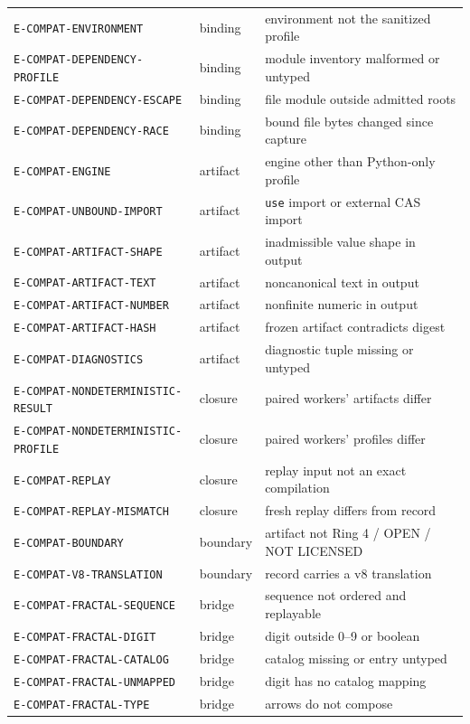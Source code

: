 \begin{longtable}{@{}lll@{}}
\texttt{E-COMPAT-ENVIRONMENT} & binding & environment not the sanitized profile \\
\texttt{E-COMPAT-DEPENDENCY-PROFILE} & binding & module inventory malformed or untyped \\
\texttt{E-COMPAT-DEPENDENCY-ESCAPE} & binding & file module outside admitted roots \\
\texttt{E-COMPAT-DEPENDENCY-RACE} & binding & bound file bytes changed since capture \\
\texttt{E-COMPAT-ENGINE} & artifact & engine other than Python-only profile \\
\texttt{E-COMPAT-UNBOUND-IMPORT} & artifact & \texttt{use} import or external CAS import \\
\texttt{E-COMPAT-ARTIFACT-SHAPE} & artifact & inadmissible value shape in output \\
\texttt{E-COMPAT-ARTIFACT-TEXT} & artifact & noncanonical text in output \\
\texttt{E-COMPAT-ARTIFACT-NUMBER} & artifact & nonfinite numeric in output \\
\texttt{E-COMPAT-ARTIFACT-HASH} & artifact & frozen artifact contradicts digest \\
\texttt{E-COMPAT-DIAGNOSTICS} & artifact & diagnostic tuple missing or untyped \\
\texttt{E-COMPAT-NONDETERMINISTIC-RESULT} & closure & paired workers' artifacts differ \\
\texttt{E-COMPAT-NONDETERMINISTIC-PROFILE} & closure & paired workers' profiles differ \\
\texttt{E-COMPAT-REPLAY} & closure & replay input not an exact compilation \\
\texttt{E-COMPAT-REPLAY-MISMATCH} & closure & fresh replay differs from record \\
\texttt{E-COMPAT-BOUNDARY} & boundary & artifact not Ring 4 / OPEN / NOT LICENSED \\
\texttt{E-COMPAT-V8-TRANSLATION} & boundary & record carries a v8 translation \\
\texttt{E-COMPAT-FRACTAL-SEQUENCE} & bridge & sequence not ordered and replayable \\
\texttt{E-COMPAT-FRACTAL-DIGIT} & bridge & digit outside 0--9 or boolean \\
\texttt{E-COMPAT-FRACTAL-CATALOG} & bridge & catalog missing or entry untyped \\
\texttt{E-COMPAT-FRACTAL-UNMAPPED} & bridge & digit has no catalog mapping \\
\texttt{E-COMPAT-FRACTAL-TYPE} & bridge & arrows do not compose \\
\end{longtable}


